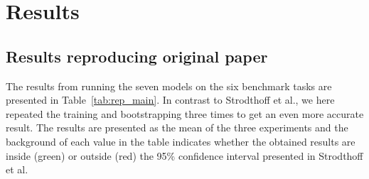 \newpage
\section{Results}
\label{sec:results}



\subsection{Results reproducing original paper}

The results from running the seven models on the six benchmark tasks are presented in Table~\ref{tab:rep_main}. In contrast to Strodthoff et al., we here repeated the training and bootstrapping three times to get an even more accurate result. The results are presented as the mean of the three experiments and the background of each value in the table indicates whether the obtained results are inside (green) or outside (red) the 95\% confidence interval presented in Strodthoff et al. 


